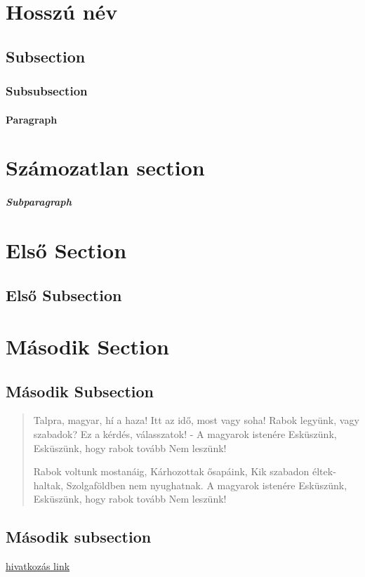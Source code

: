 \documentclass[12pt,twoside]{article}
\begin{document}
\section[Rövid név]{Hosszú név}
\subsection{Subsection}
\label{s:masodik}
\subsubsection{Subsubsection}
\paragraph{Paragraph}
\section*{Számozatlan section}
\label{s:szamozatlan}
\subparagraph{Subparagraph}

\appendix
\section{Első Section}
\subsection{Első Subsection}
\quote{\hulipsum[2]}
\label{s:harmadik}
\section{Második Section}
\subsection{Második Subsection}
\quotation{\blindtext[2]}
\clearpage
\begin{verse}
Talpra, magyar, hí a haza!
Itt az idő, most vagy soha!
Rabok legyünk, vagy szabadok?
Ez a kérdés, válasszatok! -
A magyarok istenére
Esküszünk,
Esküszünk, hogy rabok tovább
Nem leszünk!

Rabok voltunk mostanáig,
Kárhozottak ősapáink,
Kik szabadon éltek-haltak,
Szolgaföldben nem nyughatnak.
A magyarok istenére
Esküszünk,
Esküszünk, hogy rabok tovább
Nem leszünk!


\end{verse}
\subsection{Második subsection}
\href{https://www.uni-miskolc.hu/~viktoria.vadon/}{hivatkozás link}
\end{document}
